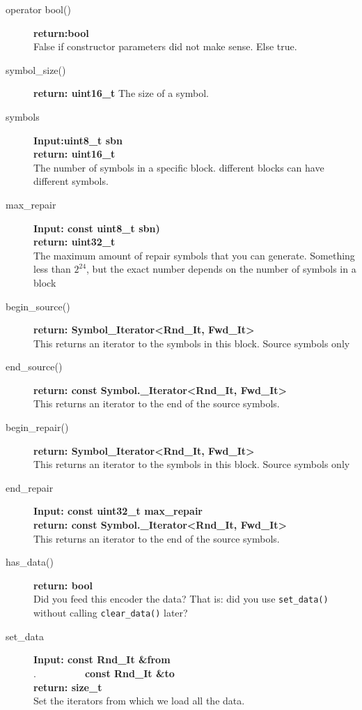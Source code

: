 \documentclass[11pt,a4paper]{refart}
\begin{document}
\begin{description}
\item[operator bool()] \textbf{return:bool}\\
False if constructor parameters did not make sense. Else true.


\item[symbol\_size()] \textbf{return: uint16\_t} The size of a symbol.

\item[symbols] \textbf{Input:uint8\_t sbn}\\
\textbf{return: uint16\_t}\\
The number of symbols in a specific block. different blocks can have different symbols.

\item[max\_repair] \textbf{Input: const uint8\_t sbn)}\\
\textbf{return: uint32\_t}\\
The maximum amount of repair symbols that you can generate. Something less than $2^{24}$, but the exact number depends on the number of symbols in a block

\item[begin\_source()] \textbf{return: Symbol\_Iterator<Rnd\_It, Fwd\_It>}\\
This returns an iterator to the symbols in this block. Source symbols only
\item[end\_source()] \textbf{return: const Symbol.\_Iterator<Rnd\_It, Fwd\_It>}\\
This returns an iterator to the end of the source symbols.
\item[begin\_repair()] \textbf{return: Symbol\_Iterator<Rnd\_It, Fwd\_It>}\\
This returns an iterator to the symbols in this block. Source symbols only
\item[end\_repair] \textbf{Input: const uint32\_t max\_repair}\\
\textbf{return: const Symbol.\_Iterator<Rnd\_It, Fwd\_It>}\\
This returns an iterator to the end of the source symbols.

\item[has\_data()] \textbf{return: bool}\\
Did you feed this encoder the data? That is: did you use \texttt{set\_data()} without calling \texttt{clear\_data()} later?

\item[set\_data] \textbf{Input: const Rnd\_It \&from}\\
.\ \ \ \ \ \ \ \ \ \ \textbf{const Rnd\_It \&to}\\
\textbf{return: size\_t}\\
Set the iterators from which we load all the data.


\end{description}
\end{document}
